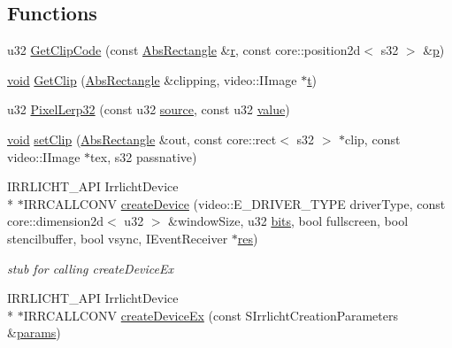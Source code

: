 \subsection*{Functions}
\begin{DoxyCompactItemize}
\item 
u32 \hyperlink{namespaceirr_af4d2e4162c604839ffa20952ab42ae91}{Get\-Clip\-Code} (const \hyperlink{structirr_1_1_abs_rectangle}{Abs\-Rectangle} \&\hyperlink{glext_8h_abe08814c2f72843fde4d8df41440d5a0}{r}, const core\-::position2d$<$ s32 $>$ \&\hyperlink{glext_8h_aa5367c14d90f462230c2611b81b41d23}{p})
\item 
\hyperlink{wglext_8h_a9e6b7f1933461ef318bb000d6bd13b83}{void} \hyperlink{namespaceirr_a025df9c688152c1cbc7c32a19caf4b2d}{Get\-Clip} (\hyperlink{structirr_1_1_abs_rectangle}{Abs\-Rectangle} \&clipping, video\-::\-I\-Image $\ast$\hyperlink{glext_8h_a00140d6f5c548b26daf170bf16e86a6d}{t})
\item 
u32 \hyperlink{namespaceirr_a8d7d380f15452450f4a6bc9f0107b5c9}{Pixel\-Lerp32} (const u32 \hyperlink{glext_8h_afdd0f0e67e302eefcb4f6b23732e7ea3}{source}, const u32 \hyperlink{glext_8h_a79169be77d7e02a24f68a5bfe627dc29}{value})
\item 
\hyperlink{wglext_8h_a9e6b7f1933461ef318bb000d6bd13b83}{void} \hyperlink{namespaceirr_a36c604989dd9f1db04858b3f54e4c33e}{set\-Clip} (\hyperlink{structirr_1_1_abs_rectangle}{Abs\-Rectangle} \&out, const core\-::rect$<$ s32 $>$ $\ast$clip, const video\-::\-I\-Image $\ast$tex, s32 passnative)
\item 
I\-R\-R\-L\-I\-C\-H\-T\-\_\-\-A\-P\-I Irrlicht\-Device \\*
$\ast$I\-R\-R\-C\-A\-L\-L\-C\-O\-N\-V \hyperlink{namespaceirr_a76e06a2193f58be59fcf0e30145516d5}{create\-Device} (video\-::\-E\-\_\-\-D\-R\-I\-V\-E\-R\-\_\-\-T\-Y\-P\-E driver\-Type, const core\-::dimension2d$<$ u32 $>$ \&window\-Size, u32 \hyperlink{glext_8h_a47cf4c5c5dc1c252e3be3e4f59ffb98a}{bits}, bool fullscreen, bool stencilbuffer, bool vsync, I\-Event\-Receiver $\ast$\hyperlink{glext_8h_a1dbb21208b9047cc8031ca9c840d3c2f}{res})
\begin{DoxyCompactList}\small\item\em stub for calling create\-Device\-Ex \end{DoxyCompactList}\item 
I\-R\-R\-L\-I\-C\-H\-T\-\_\-\-A\-P\-I Irrlicht\-Device \\*
$\ast$I\-R\-R\-C\-A\-L\-L\-C\-O\-N\-V \hyperlink{namespaceirr_ac87a68ed29e7b6f454a5bfa5efc43bec}{create\-Device\-Ex} (const S\-Irrlicht\-Creation\-Parameters \&\hyperlink{glext_8h_a7eca977aec48ecd8d48ebd7558c0538c}{params})

\end{DoxyCompactItemize}
